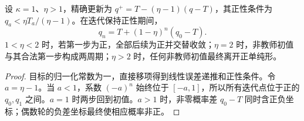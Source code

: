 \begin{proposition}[算术外推的完整分类]
\label{prop:arithmetic-extrapolation}
设 $\kappa=1$、$\eta>1$，精确更新为 $q^+=T-(\eta-1)(q-T)$，其正性条件为 $q_a<\eta T_a/(\eta-1)$。在迭代保持正性期间，
\begin{equation}
q_n=T+(1-\eta)^n(q_0-T).
\end{equation}
$1<\eta<2$ 时，若第一步为正，全部后续为正并交替收敛；$\eta=2$ 时，非教师初值与其合法第一步构成两周期；$\eta>2$ 时，任何非教师初值最终离开正单纯形。
\end{proposition}
\begin{proof}
目标的归一化常数为一，直接移项得到线性误差递推和正性条件。令 $a=\eta-1$。当 $a<1$，系数 $(-a)^n$ 始终位于 $[-a,1]$，所以所有迭代点位于正的 $q_0,q_1$ 之间。$a=1$ 时两步回到初值。$a>1$ 时，非零概率差 $q_0-T$ 同时含正负坐标；偶数轮的负差坐标最终使相应概率非正。
\end{proof}


